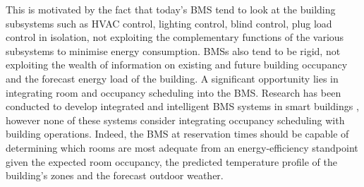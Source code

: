 
This is motivated by the fact that today's BMS tend to look at the building subsystems such as HVAC control, lighting control, blind control, plug load control in isolation, not exploiting the complementary functions of the various subsystems to minimise energy consumption. BMSs also tend to be rigid, not exploiting the wealth of information on existing and future building occupancy and the forecast energy load of the building. A significant opportunity lies in integrating room and occupancy scheduling into the BMS. Research has been conducted to develop integrated and intelligent BMS systems in smart buildings \citep{honeywell2016hvac,biq2014moving,biq2014managing,lu2012integrated,smith2011energy,klee2011seven}, however none of these systems consider integrating occupancy scheduling with building operations. Indeed, the BMS at reservation times should be capable of determining which rooms are most adequate from an energy-efficiency standpoint given the expected room occupancy, the predicted temperature profile of the building's zones and the forecast outdoor weather. 

